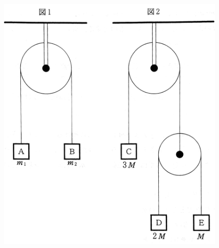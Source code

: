\begin{figure}[htbp]
  \centering
  \includegraphics[width=20zw]{../graphs/se_1H_102.png}
\end{figure}

